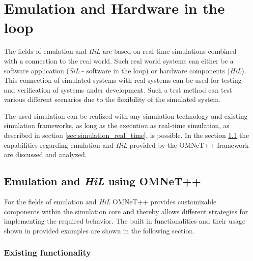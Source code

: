 \chapter{Emulation and Hardware in the loop}
\label{cha:emulation}

The fields of emulation and \emph{HiL} are based on real-time simulations combined with a connection to the real world.
Such real world systems can either be a software application (\emph{SiL} - software in the loop) or hardware components (\emph{HiL}).
This connection of simulated systems with real systems can be used for testing and verification of systems under development.
Such a test method can test various different scenarios due to the flexibility of the simulated system.
\cite[section I]{lu_low-cost_2007}

The used simulation can be realized with any simulation technology and existing simulation frameworks, as long as the execution as real-time simulation, as described in section \ref{sec:simulation_real_time}, is possible.
In the section \ref{sec:emulation_omnet} the capabilities regarding emulation and \emph{HiL} provided by the OMNeT++ framework are discussed and analyzed.

\section{Emulation and \emph{HiL} using OMNeT++}
\label{sec:emulation_omnet}
For the fields of emulation and \emph{HiL} OMNeT++ provides customizable components within the simulation core and thereby allows different strategies for implementing the required behavior.
The built in functionalities and their usage shown in provided examples are shown in the following section.

\subsection{Existing functionality}
\label{sec:emulation_omnet_existing}

